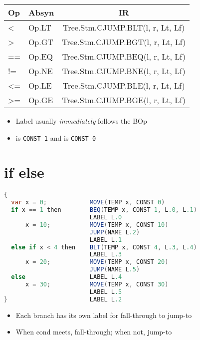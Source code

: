 \begin{tabular}{>{\ttfamily}l|>{\ttfamily}l>{\ttfamily}c}
  \hline
  Op & Absyn & IR       \\
  \hline
  <     & Op.LT & Tree.Stm.CJUMP.BLT(l, r, Lt, Lf) \\
  >     & Op.GT & Tree.Stm.CJUMP.BGT(l, r, Lt, Lf) \\
  ==    & Op.EQ & Tree.Stm.CJUMP.BEQ(l, r, Lt, Lf) \\
  !=    & Op.NE & Tree.Stm.CJUMP.BNE(l, r, Lt, Lf) \\
  <=    & Op.LE & Tree.Stm.CJUMP.BLE(l, r, Lt, Lf) \\
  >=    & Op.GE & Tree.Stm.CJUMP.BGE(l, r, Lt, Lf) \\
  \hline
\end{tabular}
\begin{itemize}
\item Label  usually \emph{immediately} follows the BOp
\item {} is \texttt{CONST 1} and  is \texttt{CONST 0}
\end{itemize}

\section*{if else}
\begin{lstlisting}[frame=none,language=Java,morekeywords={then}]
{
  var x = 0;            MOVE(TEMP x, CONST 0)
  if x == 1 then        BEQ(TEMP x, CONST 1, L.0, L.1)
                        LABEL L.0
      x = 10;           MOVE(TEMP x, CONST 10)
                        JUMP(NAME L.2)
                        LABEL L.1
  else if x < 4 then    BLT(TEMP x, CONST 4, L.3, L.4)
                        LABEL L.3
      x = 20;           MOVE(TEMP x, CONST 20)
                        JUMP(NAME L.5)
  else                  LABEL L.4
      x = 30;           MOVE(TEMP x, CONST 30)
                        LABEL L.5
}                       LABEL L.2
\end{lstlisting}
\begin{itemize}
\item Each branch has its own label for fall-through to jump-to
\item When cond meets, fall-through; when not, jump-to
\end{itemize}
